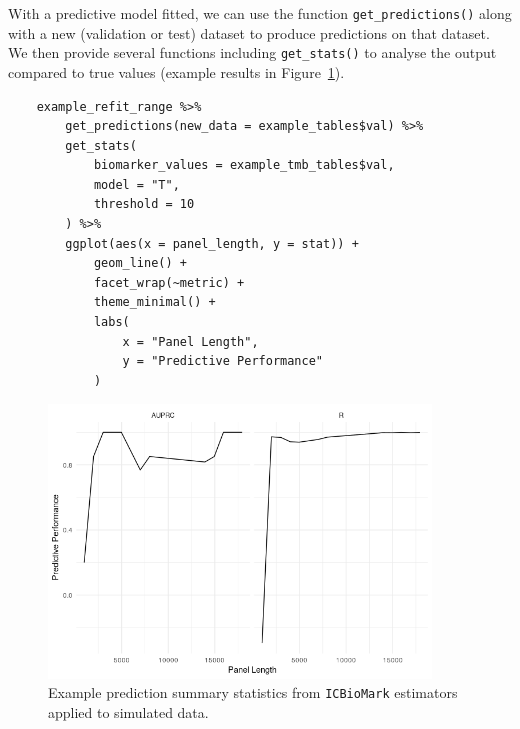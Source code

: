 \documentclass[../thesis.tex]{subfiles}
\begin{document}
With a predictive model fitted, we can use the function \lstinline{get_predictions()} along with a new (validation or test) dataset to produce predictions on that dataset. We then provide several functions including \lstinline{get_stats()} to analyse the output compared to true values (example results in Figure~\ref{fig:readme_example_predictions}).
\begin{lstlisting}
    example_refit_range %>% 
        get_predictions(new_data = example_tables$val) %>%
        get_stats(
            biomarker_values = example_tmb_tables$val, 
            model = "T", 
            threshold = 10
        ) %>% 
        ggplot(aes(x = panel_length, y = stat)) + 
            geom_line() + 
            facet_wrap(~metric) + 
            theme_minimal() + 
            labs(
                x = "Panel Length", 
                y = "Predictive Performance"
            )
\end{lstlisting}
\begin{figure}[htbp]
    \centering
    \includegraphics[width=4in]{figures/chapter3/README-example_predictions-1.png}
    \caption{Example prediction summary statistics from \texttt{ICBioMark} estimators applied to simulated data.}
    \label{fig:readme_example_predictions}
\end{figure}
\dobib %
 
\end{document}
